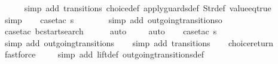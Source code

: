 \begin{isabellebody}
\ \ \ \ \isamarkupfalse%
\ {\isacharparenleft}simp\ add{\isacharcolon}\ transitions\ choice{\isacharunderscore}def\ apply{\isacharunderscore}guards{\isacharunderscore}def\ Str{\isacharunderscore}def\ value{\isacharunderscore}eq{\isacharunderscore}true{\isacharparenright}\isanewline
\ \ \ \ \isamarkupfalse%
\ simp\isanewline
\isanewline
\ \ \isamarkupfalse%
\ {\isacharparenleft}case{\isacharunderscore}tac\ {\isachardoublequoteopen}s{\isasymin}{\isacharbraceleft}{}{\isacharcomma}\ {}{\isacharcomma}\ {}{\isacharcomma}\ {}{\isacharbraceright}{\isachardoublequoteclose}{\isacharparenright}\isanewline
\ \ \ \isamarkupfalse%
\ {\isacharparenleft}simp\ add{\isacharcolon}\ outgoing{\isacharunderscore}transitions{\isacharunderscore}o{\isacharparenright}\isanewline
\ \ \ \isamarkupfalse%
\ {\isacharparenleft}case{\isacharunderscore}tac\ {\isachardoublequoteopen}bc{\isacharequal}startsearch{\isachardoublequoteclose}{\isacharparenright}\isanewline
\ \ \ \ \isamarkupfalse%
\ auto{\isacharbrackleft}{}{\isacharbrackright}\isanewline
\ \ \ \isamarkupfalse%
\ auto{\isacharbrackleft}{}{\isacharbrackright}\isanewline
\isanewline
\ \ \isamarkupfalse%
\ {\isacharparenleft}case{\isacharunderscore}tac\ {\isachardoublequoteopen}s{\isacharequal}{}{\isachardoublequoteclose}{\isacharparenright}\isanewline
\ \ \ \isamarkupfalse%
\ {\isacharparenleft}simp\ add{\isacharcolon}\ outgoing{\isacharunderscore}transitions{\isacharunderscore}{}{\isacharparenright}\isanewline
\ \ \isamarkupfalse%
\ {\isacharparenleft}simp\ add{\isacharcolon}\ transitions{\isacharparenright}\isanewline
\ \ \isamarkupfalse%
\ choice{\isacharunderscore}return\ \isamarkupfalse%
\ fastforce\ \isanewline
\ \ \isamarkupfalse%
\ {\isacharparenleft}simp\ add{\isacharcolon}\ lift{\isacharunderscore}def\ outgoing{\isacharunderscore}transitions{\isacharunderscore}def{\isacharparenright}%
\endisatagproof
{\isafoldproof}%
%
\isadelimproof
\isanewline
%
\endisadelimproof
%
\isadelimtheory
\isanewline
%
\endisadelimtheory
%
\isatagtheory
{}\isamarkupfalse%
%
\endisatagtheory
{\isafoldtheory}%
%
\isadelimtheory
%
\endisadelimtheory
%
\end{isabellebody}%
\endinput
